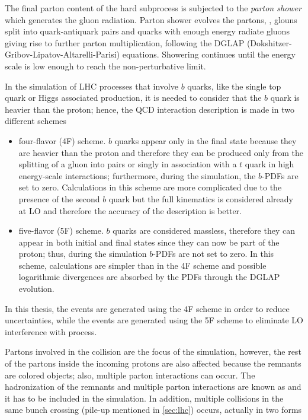 The final parton content of the hard subprocess is subjected to the \textit{parton shower} which generates the gluon radiation. Parton shower evolves the partons, \ie, glouns split into quark-antiquark pairs and quarks with enough energy radiate gluons giving rise to further parton multiplication, following the DGLAP (Dokshitzer-Gribov-Lipatov-Altarelli-Parisi) equations. Showering continues until the energy scale is low enough to reach the non-perturbative limit.   

In the simulation of LHC processes that involve $b$ quarks, like the single top quark or Higgs associated production, it is needed to consider that the $b$ quark is heavier than the proton; hence, the QCD interaction description is made in two different schemes \cite{schemes}

\begin{itemize}

\item four-flavor (4F) scheme. $b$ quarks appear only in the final state because they are heavier than the proton and therefore they can be produced only from the splitting of a gluon into pairs or singly in association with a $t$ quark in high energy-scale interactions; furthermore, during the simulation, the $b$-PDFs are set to zero. Calculations in this scheme are more complicated due to the presence of the second $b$ quark but the full kinematics is considered already at LO and therefore the accuracy of the description is better.   

\item five-flavor (5F) scheme. $b$ quarks are considered massless, therefore they can appear in both initial and final states since they can now be part of the proton; thus, during the simulation $b$-PDFs are not set to zero. In this scheme, calculations are simpler than in the 4F scheme and possible logarithmic divergences are absorbed by the PDFs through the DGLAP evolution.   
\end{itemize}

In this thesis, the \tHq events are generated using the 4F scheme in order to reduce uncertainties, while the \tHW events are generated using the 5F scheme to eliminate LO interference with \ttH process\cite{demartin}.    

Partons involved in the \pp collision are the focus of the simulation, however, the rest of the partons inside the incoming protons are also affected because the remnants are colored objects; also, multiple parton interactions can occur. The hadronization of the remnants and multiple parton interactions are known as  and it has to be included in the simulation. In addition, multiple \pp collisions in the same bunch crossing (pile-up mentioned in \ref{sec:lhc}) occurs, actually in two forms

